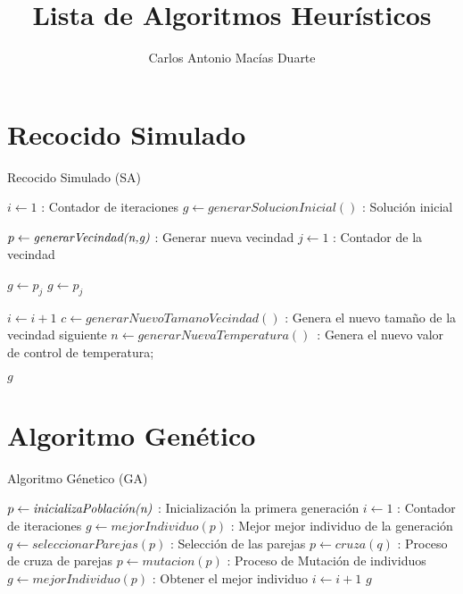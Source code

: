 \documentclass[10pt,letterpaper,twoside,openright]{article}
\author{Carlos Antonio Macías Duarte}
\title{Lista de Algoritmos Heurísticos}
\begin{document}
	\maketitle
			
	\section{Recocido Simulado}
	
		\begin{algorithm}[H]
			\caption{Recocido Simulado (SA)}
				$ i \leftarrow 1 $ : Contador de iteraciones\;
				$ g \leftarrow generarSolucionInicial() $ : Solución inicial\;
				{
					$ p \leftarrow \emph{generarVecindad(n,g)}$ : Generar nueva vecindad\;
					$ j \leftarrow 1 $ : Contador de la vecindad\;
					{
						{
							$ g \leftarrow p_{j} $\;
						}
						{
							$ g \leftarrow p_{j} $\;
						}
						
					}			
					$ i \leftarrow  i + 1 $\;
					$ c \leftarrow  generarNuevoTamanoVecindad() $ : Genera el nuevo tamaño de la vecindad siguiente\;
					$ n \leftarrow  generarNuevaTemperatura() $\ :  Genera el nuevo valor de control de temperatura;
				}
		 		\Return $ g $
		 \end{algorithm}
	
	\section{Algoritmo Genético}
	
		\begin{algorithm}[H]
			\caption{Algoritmo Génetico (GA)}
				$ p \leftarrow \emph{inicializaPoblación(n)}$ : Inicialización la primera generación\;
				$ i \leftarrow 1 $ : Contador de iteraciones\;
				$ g \leftarrow mejorIndividuo(p) $ : Mejor mejor individuo de la generación\;
				$q \leftarrow seleccionarParejas(p) $ : Selección de las parejas\;
				{
					$ p \leftarrow cruza(q) $ : Proceso de cruza de parejas\;
					$ p \leftarrow mutacion(p) $ : Proceso de Mutación de individuos\;
					$ g \leftarrow mejorIndividuo(p) $ : Obtener el mejor individuo\;
					$ i \leftarrow  i + 1 $\;
				}
		 		\Return $ g $
		 \end{algorithm}
	
\end{document}
